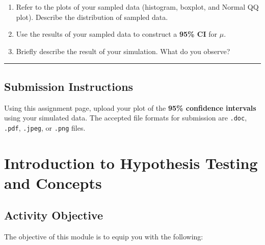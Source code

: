 \documentclass[oneside,openany]{book}
\begin{document}
\begin{enumerate}
\def\labelenumi{\arabic{enumi}.}
\item
  Refer to the plots of your sampled data (histogram, boxplot, and Normal QQ plot). Describe the distribution of sampled data.
\item
  Use the results of your sampled data to construct a \textbf{95\% CI} for \(\mu\).
\item
  Briefly describe the result of your simulation. What do you observe?
\end{enumerate}

\begin{center}\rule{0.5\linewidth}{0.5pt}\end{center}

\section{Submission Instructions}\label{submission-instructions}

Using this assignment page, upload your plot of the \textbf{95\% confidence intervals} using your simulated data. The accepted file formats for  submission are \texttt{.doc}, \texttt{.pdf}, \texttt{.jpeg}, or \texttt{.png} files.

\chapter{Introduction to Hypothesis Testing and Concepts}\label{activity-6---introduction-to-hypothesis-testing-and-concepts}

\section{Activity Objective}\label{activity-objective-3}

The objective of this module is to equip you with the following:
\end{document}
